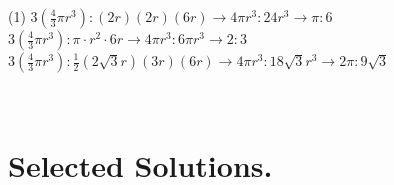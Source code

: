 \documentclass[12pt,fleqn]{book}
\newcommand{\sol}[1]{\begin{Answer}\parbox[t]{\textwidth-5em}{#1}\end{Answer}}
\begin{document}
\sol{
	\begin{tasks}(1)
		\task $3\left(\frac{4}{3} \pi r^3\right):(2 r)(2 r)(6 r) \rightarrow 4 \pi r^3: 24 r^3 \rightarrow \pi: 6$
		\task $3\left(\frac{4}{3} \pi r^3\right): \pi \cdot r^2 \cdot 6 r \rightarrow 4 \pi r^3: 6 \pi r^3 \rightarrow 2: 3$
		\task $3\left(\frac{4}{3} \pi r^3\right): \frac{1}{2}(2 \sqrt{3} r)(3 r)(6 r) \rightarrow 4 \pi r^3: 18 \sqrt{3} r^3 \rightarrow 2 \pi: 9 \sqrt{3}$
	\end{tasks}
}
\clearpage \ 
\clearpage
\chapter{Selected Solutions.}
\shipoutAnswer
\end{document}
